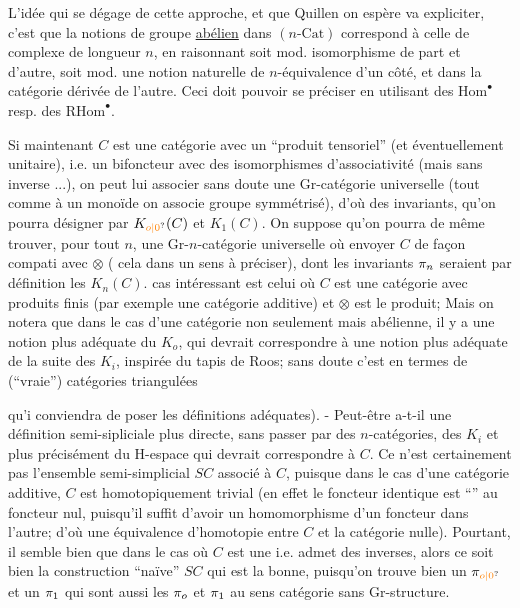 L'idée qui se dégage de cette approche, et que Quillen on espère va expliciter, c'est que la  notions de groupe \uline{abélien} dans $(n\text{-}\mathrm{Cat})$ correspond à celle de complexe de  longueur $n$, en raisonnant soit mod. isomorphisme de part et d'autre, soit mod. une notion naturelle de $n$-équivalence d'un côté, et dans la catégorie dérivée de l'autre. Ceci doit pouvoir se préciser en utilisant des $\mathrm{Hom}^{\bullet}$ resp. des $\mathrm{RHom}^{\bullet}$.

Si maintenant $C$ est une catégorie avec un ``produit tensoriel''  (et éventuellement unitaire), i.e. un bifoncteur avec des isomorphismes d'associativité (mais sans inverse ...), on peut lui associer \deleted{\unsure{(}}sans doute une Gr-catégorie universelle (tout comme à un monoïde on associe  groupe symmétrisé), d'où des invariants, qu'on pourra désigner par $K_{\unsure{o|0}}(C)$ et $K_1(C)$. On suppose qu'on pourra de même trouver, pour tout $n$, une Gr-$n$-catégorie universelle où envoyer $C$ de façon compati avec $\otimes$ ( cela dans un sens à préciser), dont les invariants $\pi_n$ seraient par définition les $K_n(C)$.  cas intéressant est celui où $C$ est une catégorie avec produits finis (par exemple une catégorie additive) et $\otimes$ est le produit;  \deleted{(}\handwritten{[}Mais on notera que dans le cas d'une catégorie non seulement  mais abélienne, il y a une notion plus adéquate du $K_o$, qui devrait correspondre à une notion plus adéquate de la suite des $K_i$, inspirée du tapis de Roos; sans doute c'est en termes de (``vraie'') catégories triangulées


qu'i conviendra de poser les définitions adéquates). - Peut-être  a-t-il une définition semi-sipliciale plus directe, sans passer par des $n$-catégories, des $K_i$ et plus précisément du H-espace qui devrait correspondre à $C$.
 Ce n'est certainement  pas l'ensemble semi-simplicial $SC$  associé à $C$, puisque dans le cas d'une catégorie additive, $C$ est homotopiquement trivial (en effet le foncteur identique est ``'' au foncteur nul, puisqu'il suffit d'avoir un homomorphisme d'un foncteur dans l'autre; d'où une équivalence d'homotopie entre $C$ et la catégorie nulle). Pourtant, il semble bien que dans le cas où $C$ est une  i.e. admet des inverses, alors ce soit bien la construction ``naïve'' $SC$ qui est la bonne, puisqu'on trouve bien un $\handwritten{\pi}_{\unsure{o|0}}$ et un $\pi_1$ qui sont aussi les $\pi_o$ et $\pi_1$ au sens catégorie sans Gr-structure.


